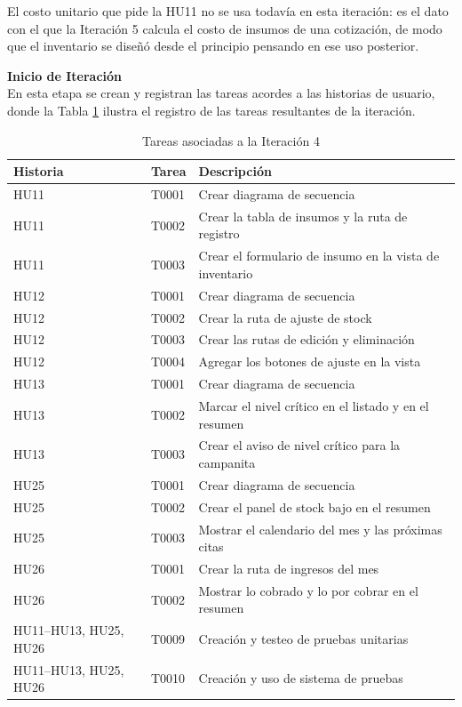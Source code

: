 \documentclass[12pt,letterpaper,oneside]{report}
\newcommand{\tituloparpegado}[1]{\par\textbf{#1}\\\indent\ignorespaces}
\begin{document}
El costo unitario que pide la HU11 no se usa todavía en esta iteración: es el dato con el que la Iteración 5 calcula el costo de insumos de una cotización, de modo que el inventario se diseñó desde el principio pensando en ese uso posterior.

\vspace{0.3cm}
\tituloparpegado{Inicio de Iteración}
En esta etapa se crean y registran las tareas acordes a las historias de usuario, donde la Tabla \ref{tab:tareas4} ilustra el registro de las tareas resultantes de la iteración.

\begin{table}[H]
  \centering
  \caption{Tareas asociadas a la Iteración 4}
  \label{tab:tareas4}
  \renewcommand{\arraystretch}{1.2}
  \begin{tabular}{|l|l|p{7.2cm}|}
    \hline
    \textbf{Historia} & \textbf{Tarea} & \textbf{Descripción} \\
    \hline
    HU11 & T0001 & Crear diagrama de secuencia \\ \hline
    HU11 & T0002 & Crear la tabla de insumos y la ruta de registro \\ \hline
    HU11 & T0003 & Crear el formulario de insumo en la vista de inventario \\ \hline
    HU12 & T0001 & Crear diagrama de secuencia \\ \hline
    HU12 & T0002 & Crear la ruta de ajuste de stock \\ \hline
    HU12 & T0003 & Crear las rutas de edición y eliminación \\ \hline
    HU12 & T0004 & Agregar los botones de ajuste en la vista \\ \hline
    HU13 & T0001 & Crear diagrama de secuencia \\ \hline
    HU13 & T0002 & Marcar el nivel crítico en el listado y en el resumen \\ \hline
    HU13 & T0003 & Crear el aviso de nivel crítico para la campanita \\ \hline
    HU25 & T0001 & Crear diagrama de secuencia \\ \hline
    HU25 & T0002 & Crear el panel de stock bajo en el resumen \\ \hline
    HU25 & T0003 & Mostrar el calendario del mes y las próximas citas \\ \hline
    HU26 & T0001 & Crear la ruta de ingresos del mes \\ \hline
    HU26 & T0002 & Mostrar lo cobrado y lo por cobrar en el resumen \\ \hline
    HU11--HU13, HU25, HU26 & T0009 & Creación y testeo de pruebas unitarias \\ \hline
    HU11--HU13, HU25, HU26 & T0010 & Creación y uso de sistema de pruebas \\ \hline
  \end{tabular}
\end{table}
\end{document}
